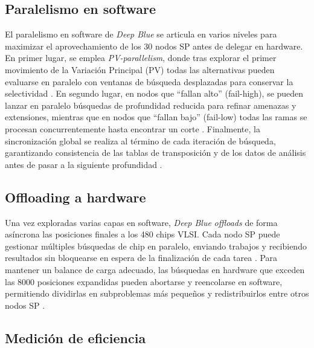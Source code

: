 \documentclass[a4paper, 12pt]{article}
\begin{document}
\subsection{Paralelismo en software}

El paralelismo en software de \textit{Deep Blue} se articula en 
varios niveles para maximizar el aprovechamiento de los 30 
nodos SP antes de delegar en hardware. En primer lugar, se 
emplea \emph{PV-parallelism}, donde tras explorar el primer 
movimiento de la Variación Principal (PV) todas las alternativas 
pueden evaluarse en paralelo con ventanas de búsqueda 
desplazadas para conservar la selectividad \cite{Campbell2002}. 
En segundo lugar, en nodos que “fallan alto” (fail-high), se 
pueden lanzar en paralelo búsquedas de profundidad reducida 
para refinar amenazas y extensiones, mientras que en nodos que 
“fallan bajo” (fail-low) todas las ramas se procesan 
concurrentemente hasta encontrar un corte \cite{Campbell2002}. 
Finalmente, la sincronización global se realiza al término de 
cada iteración de búsqueda, garantizando consistencia de las 
tablas de transposición y de los datos de análisis antes de 
pasar a la siguiente profundidad \cite{Campbell2002}.

\subsection{Offloading a hardware}

Una vez exploradas varias capas en software, \textit{Deep Blue} 
\emph{offloads} de forma asíncrona las posiciones finales a los 
480 chips VLSI. Cada nodo SP puede gestionar múltiples búsquedas 
de chip en paralelo, enviando trabajos y recibiendo resultados 
sin bloquearse en espera de la finalización de cada tarea 
\cite{Campbell2002}. Para mantener un balance de carga 
adecuado, las búsquedas en hardware que exceden las 8000 
posiciones expandidas pueden abortarse y reencolarse en 
software, permitiendo dividirlas en subproblemas más pequeños y 
redistribuirlos entre otros nodos SP \cite{Campbell2002}.

\subsection{Medición de eficiencia}
\end{document}
